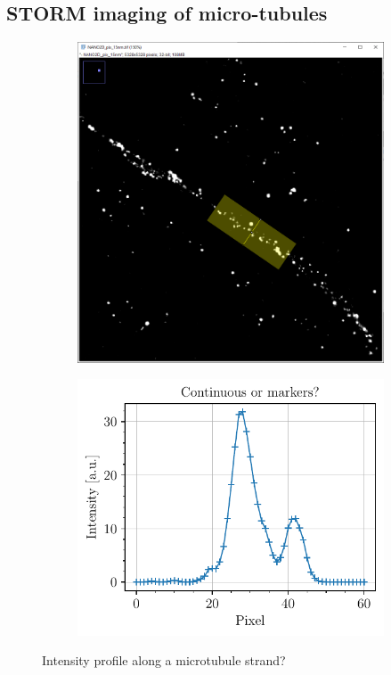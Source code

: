 \subsection{STORM imaging of micro-tubules}
\begin{figure}[htbp]
    \begin{subfigure}{0.5\textwidth}    %
        \includegraphics[width=\textwidth, trim={1cm 1.5cm 1cm 5cm}, clip]{figures/microtubules_width_acquisition.PNG}
        \caption{}
        \label{fig:microtubules_width_acquisition}
    \end{subfigure}
    \begin{subfigure}{0.5\textwidth}
        \includegraphics[scale=1]{figures/microtubules_width.pdf}
        \caption{}
        \label{fig:microtubules_width_analysis}
    \end{subfigure}
    \label{fig:microtubules_width}
    \caption{Intensity profile along a microtubule strand?}
\end{figure}

